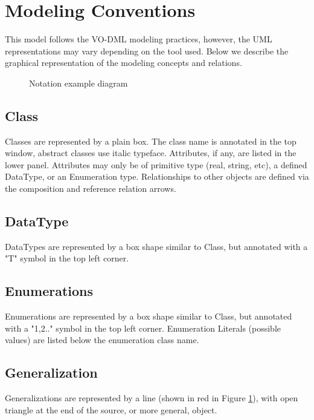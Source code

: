 \pagebreak
\section{Modeling Conventions}
This model follows the VO-DML modeling practices, however, the UML representations may vary depending on the tool used.  Below we describe the graphical representation of the modeling concepts and relations.

  \begin{figure}[h]
  \begin{center}
    \caption{Notation example diagram}\label{fig:notation_example}
  \end{center}
  \end{figure}

  \subsection{Class}
  \label{sect:Class}
  Classes are represented by a plain box. The class name is annotated in the top window, abstract
classes use italic typeface. Attributes, if any, are listed in the lower panel. Attributes may only be
of primitive type (real, string, etc), a defined DataType, or an Enumeration type. Relationships to
other objects are defined via the composition and reference relation arrows.

  \subsection{DataType}
  \label{sect:DataType}
  DataTypes are represented by a box shape similar to Class, but annotated with a "T" symbol in the top left corner.

  \subsection{Enumerations}
  \label{sect:Enumerations}
  Enumerations are represented by a box shape similar to Class, but annotated with a "1,2.."
symbol in the top left corner. Enumeration Literals (possible values) are listed below the
enumeration class name.

  \subsection{Generalization}
  \label{sect:Generalization}
  Generalizations are represented by a line (shown in red in Figure \ref{fig:notation_example}), with open triangle at the end of the source, or more general, object.

